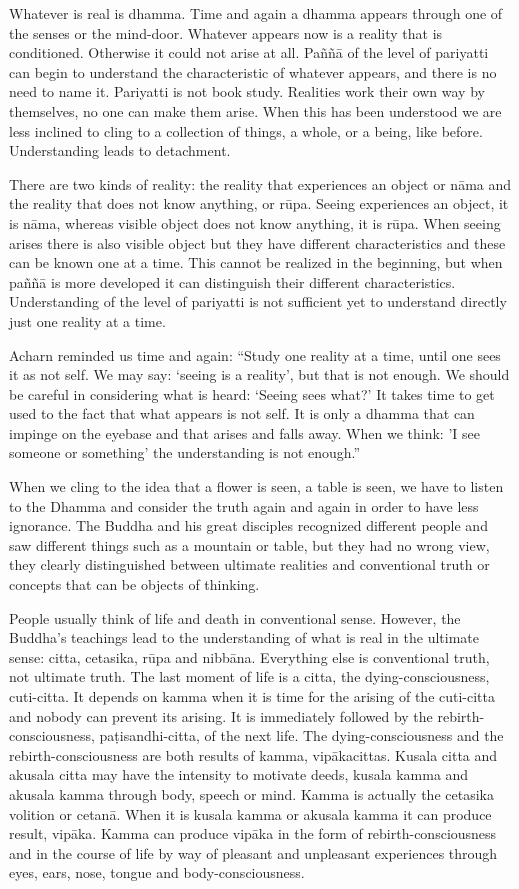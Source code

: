 Whatever is real is dhamma. Time and again a dhamma appears through one
of the senses or the mind-door. Whatever appears now is a reality that
is conditioned. Otherwise it could not arise at all. Paññā of the level
of pariyatti can begin to understand the characteristic of whatever
appears, and there is no need to name it. Pariyatti is not book study.
Realities work their own way by themselves, no one can make them arise.
When this has been understood we are less inclined to cling to a
collection of things, a whole, or a being, like before. Understanding
leads to detachment.

There are two kinds of reality: the reality that experiences an object
or nāma and the reality that does not know anything, or rūpa. Seeing
experiences an object, it is nāma, whereas visible object does not know
anything, it is rūpa. When seeing arises there is also visible object
but they have different characteristics and these can be known one at a
time. This cannot be realized in the beginning, but when paññā is more
developed it can distinguish their different characteristics.
Understanding of the level of pariyatti is not sufficient yet to
understand directly just one reality at a time.

Acharn reminded us time and again: ``Study one reality at a time, until
one sees it as not self. We may say: `seeing is a reality', but that is
not enough. We should be careful in considering what is heard: `Seeing
sees what?' It takes time to get used to the fact that what appears is
not self. It is only a dhamma that can impinge on the eyebase and that
arises and falls away. When we think: 'I see someone or something' the
understanding is not enough.''

When we cling to the idea that a flower is seen, a table is seen, we
have to listen to the Dhamma and consider the truth again and again in
order to have less ignorance. The Buddha and his great disciples
recognized different people and saw different things such as a mountain
or table, but they had no wrong view, they clearly distinguished between
ultimate realities and conventional truth or concepts that can be
objects of thinking.

People usually think of life and death in conventional sense. However,
the Buddha's teachings lead to the understanding of what is real in the
ultimate sense: citta, cetasika, rūpa and nibbāna. Everything else is
conventional truth, not ultimate truth. The last moment of life is a
citta, the dying-consciousness, cuti-citta. It depends on kamma when it
is time for the arising of the cuti-citta and nobody can prevent its
arising. It is immediately followed by the rebirth-consciousness,
paṭisandhi-citta, of the next life. The dying-consciousness and the
rebirth-consciousness are both results of kamma, vipākacittas. Kusala
citta and akusala citta may have the intensity to motivate deeds, kusala
kamma and akusala kamma through body, speech or mind. Kamma is actually
the cetasika volition or cetanā. When it is kusala kamma or akusala
kamma it can produce result, vipāka. Kamma can produce vipāka in the
form of rebirth-consciousness and in the course of life by way of
pleasant and unpleasant experiences through eyes, ears, nose, tongue and
body-consciousness.

